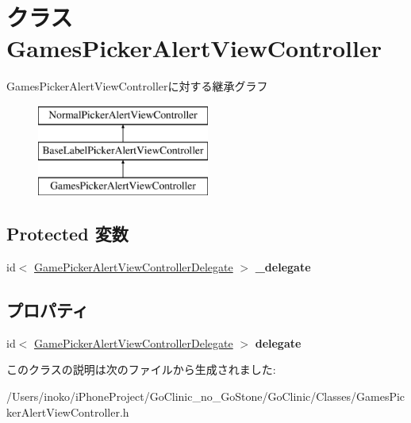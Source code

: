 \hypertarget{interface_games_picker_alert_view_controller}{
\section{クラス GamesPickerAlertViewController}
\label{interface_games_picker_alert_view_controller}
}
GamesPickerAlertViewControllerに対する継承グラフ\begin{figure}[H]
\begin{center}
\leavevmode
\includegraphics[height=3.000000cm]{interface_games_picker_alert_view_controller}
\end{center}
\end{figure}
\subsection*{Protected 変数}
\begin{DoxyCompactItemize}
\item 
\hypertarget{interface_games_picker_alert_view_controller_af026911aea6de19aa48b9c7a88d1b5bb}{
id$<$ \hyperlink{protocol_game_picker_alert_view_controller_delegate-p}{GamePickerAlertViewControllerDelegate} $>$ {\bfseries \_\-delegate}}
\label{interface_games_picker_alert_view_controller_af026911aea6de19aa48b9c7a88d1b5bb}

\end{DoxyCompactItemize}
\subsection*{プロパティ}
\begin{DoxyCompactItemize}
\item 
\hypertarget{interface_games_picker_alert_view_controller_a1d61c809e7c56216603090071b63bdb0}{
id$<$ \hyperlink{protocol_game_picker_alert_view_controller_delegate-p}{GamePickerAlertViewControllerDelegate} $>$ {\bfseries delegate}}
\label{interface_games_picker_alert_view_controller_a1d61c809e7c56216603090071b63bdb0}

\end{DoxyCompactItemize}


このクラスの説明は次のファイルから生成されました:\begin{DoxyCompactItemize}
\item 
/Users/inoko/iPhoneProject/GoClinic\_\-no\_\-GoStone/GoClinic/Classes/GamesPickerAlertViewController.h\end{DoxyCompactItemize}
